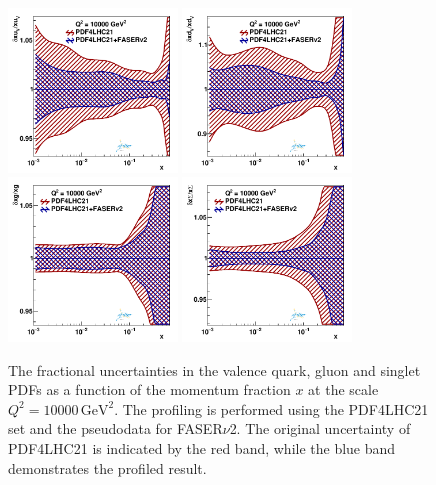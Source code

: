 \documentclass[11pt,a4paper]{article}
\numberwithin{equation}{section}
\numberwithin{figure}{section}
\numberwithin{table}{section}
\begin{document}
{\begin{figure}[H]
\centering
\includegraphics[width=0.4\textwidth]{./figs_xFitter/FASERv2_q2_10000_pdf_uv_ratio.pdf}
\includegraphics[width=0.4\textwidth]{./figs_xFitter/FASERv2_q2_10000_pdf_dv_ratio.pdf}\\
\includegraphics[width=0.4\textwidth]{./figs_xFitter/FASERv2_q2_10000_pdf_g_ratio.pdf}
\includegraphics[width=0.4\textwidth]{./figs_xFitter/FASERv2_q2_10000_pdf_Sea_ratio.pdf}
\caption{The fractional uncertainties in the valence quark, gluon and singlet PDFs as a function of the momentum fraction $x$ at the scale $Q^2 = 10000 \, \textrm{GeV}^2$. The profiling is performed using the
PDF4LHC21 set and the pseudodata for FASER$\nu$2. The original uncertainty of PDF4LHC21 is
indicated by the red band, while the blue band demonstrates the profiled result.}
\label{FASERv2_profiling}
\end{figure}

}
\end{document}
